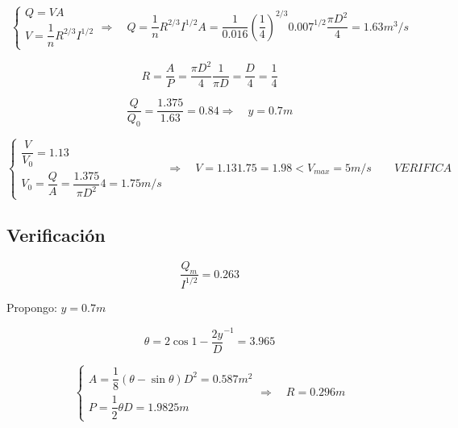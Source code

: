 \documentclass[10.5pt]{article}
\begin{document}
\begin{equation*}
  \begin{cases}
    Q = V A \\
    V = \dfrac{1}{n} R^{2/3} I^{1/2}
  \end{cases}
  \Longrightarrow \quad
  Q = \dfrac{1}{n} R^{2/3} I^{1/2} A = \dfrac{1}{0.016} (\dfrac{1}{4})^{2/3} 0.007^{1/2} \dfrac{\pi D^{2}}{4} = 1.63 m^{3}/s
\end{equation*}

\begin{equation*}
  R = \dfrac{A}{P} = \dfrac{\pi D^{2}}{4} \dfrac{1}{\pi D} = \dfrac{D}{4} = \dfrac{1}{4}
\end{equation*}

\begin{equation*}
  \dfrac{Q}{Q_{0}} = \dfrac{1.375}{1.63} = 0.84
  \Longrightarrow \quad
  y = 0.7 m
\end{equation*}

\begin{equation*}
  \begin{cases}
    \dfrac{V}{V_{0}} = 1.13 \\
    V_{0} = \dfrac{Q}{A} = \dfrac{1.375}{\pi D^{2}} 4 = 1.75 m/s
  \end{cases}
  \Longrightarrow \quad
  V = 1.13 1.75 = 1.98 < V_{max} = 5 m/s
  \qquad
  VERIFICA
\end{equation*}



\subsection*{Verificación}

\begin{equation*}
  \dfrac{Q_{m}}{I^{1/2}} = 0.263
\end{equation*}

Propongo: $y = 0.7 m$

\begin{equation*}
  \theta = 2 \cos{1 - \dfrac{2 y}{D}}^{-1} = 3.965
\end{equation*}

\begin{equation*}
  \begin{cases}
    A = \dfrac{1}{8} (\theta - \sin{\theta}) D^{2} = 0.587 m^{2} \\
    P = \dfrac{1}{2} \theta D = 1.9825 m
  \end{cases}
  \Longrightarrow \quad
  R = 0.296 m
\end{equation*}
\end{document}
